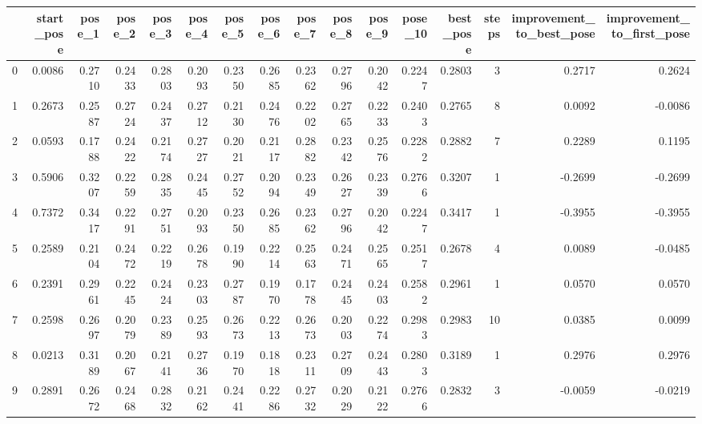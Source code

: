 \begin{tabular}{lrrrrrrrrrrrrrrr}
\toprule
{} &  start\_pose &  pose\_1 &  pose\_2 &  pose\_3 &  pose\_4 &  pose\_5 &  pose\_6 &  pose\_7 &  pose\_8 &  pose\_9 &  pose\_10 &  best\_pose &  steps &  improvement\_to\_best\_pose &  improvement\_to\_first\_pose \\
\midrule
0  &      0.0086 &  0.2710 &  0.2433 &  0.2803 &  0.2093 &  0.2350 &  0.2685 &  0.2362 &  0.2796 &  0.2042 &   0.2247 &     0.2803 &      3 &                    0.2717 &                     0.2624 \\
1  &      0.2673 &  0.2587 &  0.2724 &  0.2437 &  0.2712 &  0.2130 &  0.2476 &  0.2202 &  0.2765 &  0.2233 &   0.2403 &     0.2765 &      8 &                    0.0092 &                    -0.0086 \\
2  &      0.0593 &  0.1788 &  0.2422 &  0.2174 &  0.2727 &  0.2021 &  0.2117 &  0.2882 &  0.2342 &  0.2576 &   0.2282 &     0.2882 &      7 &                    0.2289 &                     0.1195 \\
3  &      0.5906 &  0.3207 &  0.2259 &  0.2835 &  0.2445 &  0.2752 &  0.2094 &  0.2349 &  0.2627 &  0.2339 &   0.2766 &     0.3207 &      1 &                   -0.2699 &                    -0.2699 \\
4  &      0.7372 &  0.3417 &  0.2291 &  0.2751 &  0.2093 &  0.2350 &  0.2685 &  0.2362 &  0.2796 &  0.2042 &   0.2247 &     0.3417 &      1 &                   -0.3955 &                    -0.3955 \\
5  &      0.2589 &  0.2104 &  0.2472 &  0.2219 &  0.2678 &  0.1990 &  0.2214 &  0.2563 &  0.2471 &  0.2565 &   0.2517 &     0.2678 &      4 &                    0.0089 &                    -0.0485 \\
6  &      0.2391 &  0.2961 &  0.2245 &  0.2424 &  0.2303 &  0.2787 &  0.1970 &  0.1778 &  0.2445 &  0.2403 &   0.2582 &     0.2961 &      1 &                    0.0570 &                     0.0570 \\
7  &      0.2598 &  0.2697 &  0.2079 &  0.2389 &  0.2593 &  0.2673 &  0.2213 &  0.2673 &  0.2003 &  0.2274 &   0.2983 &     0.2983 &     10 &                    0.0385 &                     0.0099 \\
8  &      0.0213 &  0.3189 &  0.2067 &  0.2141 &  0.2736 &  0.1970 &  0.1818 &  0.2311 &  0.2709 &  0.2443 &   0.2803 &     0.3189 &      1 &                    0.2976 &                     0.2976 \\
9  &      0.2891 &  0.2672 &  0.2468 &  0.2832 &  0.2162 &  0.2441 &  0.2286 &  0.2732 &  0.2029 &  0.2122 &   0.2766 &     0.2832 &      3 &                   -0.0059 &                    -0.0219 \\

\end{tabular}
